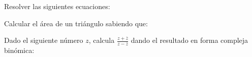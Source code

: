\documentclass[addpoints,spanish, 12pt,a4paper]{exam}
\begin{document}
\begin{questions}
\begin{multicols}{1}
\begin{parts}
        \end{parts}
        \end{multicols}
        \question Resolver las siguientes ecuaciones:
        \begin{multicols}{1} 
        \end{multicols}
        \question Calcular el área de un triángulo sabiendo que:
        \begin{multicols}{1} 
        \end{multicols}
        \question Dado el siguiente número $z$, calcula $\frac{z+\overline{z}}{z-\overline{z}}$ dando el resultado en forma compleja binómica:
        \begin{multicols}{1} 
        \end{multicols}
        
    \end{questions}
    
\end{document}
